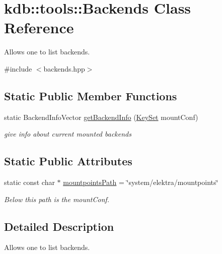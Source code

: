 \hypertarget{classkdb_1_1tools_1_1Backends}{\section{kdb\-:\-:tools\-:\-:Backends Class Reference}
\label{classkdb_1_1tools_1_1Backends}
}


Allows one to list backends.  




{\ttfamily \#include $<$backends.\-hpp$>$}

\subsection*{Static Public Member Functions}
\begin{DoxyCompactItemize}
\item 
static Backend\-Info\-Vector \hyperlink{classkdb_1_1tools_1_1Backends_a82b334d8a1e01df664462c6dd43bd7e1}{get\-Backend\-Info} (\hyperlink{classkdb_1_1KeySet}{Key\-Set} mount\-Conf)
\begin{DoxyCompactList}\small\item\em give info about current mounted backends \end{DoxyCompactList}\end{DoxyCompactItemize}
\subsection*{Static Public Attributes}
\begin{DoxyCompactItemize}
\item 
\hypertarget{classkdb_1_1tools_1_1Backends_ac867850accaab4fda286f763cacc3926}{static const char $\ast$ \hyperlink{classkdb_1_1tools_1_1Backends_ac867850accaab4fda286f763cacc3926}{mountpoints\-Path} = \char`\"{}system/elektra/mountpoints\char`\"{}}\label{classkdb_1_1tools_1_1Backends_ac867850accaab4fda286f763cacc3926}

\begin{DoxyCompactList}\small\item\em Below this path is the mount\-Conf. \end{DoxyCompactList}\end{DoxyCompactItemize}


\subsection{Detailed Description}
Allows one to list backends. 

